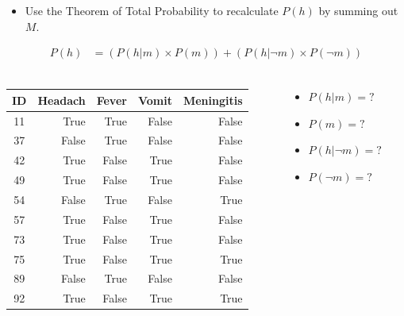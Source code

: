 \documentclass[xcolor={table}]{beamer}
\begin{document}
\begin{frame}
\begin{example}
\begin{itemize}
	\item Use the Theorem of Total Probability to recalculate $P(h)$ by summing out $M$.
\end{itemize}
\begin{alignat*}{2}
P(h) &= \left( P(h|m) \times P(m) \right) + \left( P(h|\lnot m) \times P(\lnot m) \right)\\
\end{alignat*}
\end{example}
\end{frame} 

\begin{frame}
\begin{columns}
\begin{column}{0.6\textwidth}
\begin{footnotesize}
\begin{tabular}{crrrr}
\hline
\textbf{ID} & \textbf{Headach} & \textbf{Fever} & \textbf{Vomit} & \textbf{Meningitis}\\
\hline
11 & True & True & False & False\\
37 & False & True & False & False\\
42 & True & False & True & False\\
49 & True & False & True & False\\
54 & False & True & False & True\\
57 & True & False & True & False\\
73 & True & False & True & False\\
75 & True & False & True & True\\
89 & False & True & False & False\\
92 & True & False & True & True\\
\hline
\end{tabular}
\end{footnotesize}
\end{column}
\begin{column}{0.4\textwidth}
	\begin{itemize}
		\item $P(h|m) = ?$
		\item $P(m) = ?$
		\item $P(h|\lnot m) = ?$
		\item $P(\lnot m) = ?$
	\end{itemize}
\end{column}
\end{columns}
\end{frame} 
\end{document}
